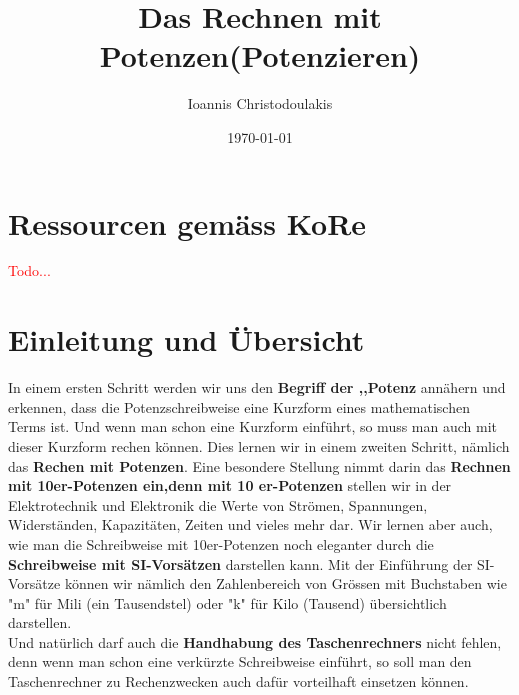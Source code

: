 \documentclass[11pt, a4paper, twoside, fleqn]{article}
\title{Das Rechnen mit Potenzen(Potenzieren)}
\author{Ioannis Christodoulakis}
\date{\today}
\begin{document}
\maketitle
\newpage
\tableofcontents
\newpage
\section{Ressourcen gemäss KoRe}
\textcolor{red}{Todo...}
\section{Einleitung und Übersicht}
In einem ersten Schritt werden wir uns den \textbf{ Begriff der  ,,Potenz} annähern und erkennen, dass die Potenzschreibweise eine Kurzform eines mathematischen Terms ist. Und wenn man schon eine Kurzform einführt, so muss man auch mit dieser Kurzform rechen können. Dies lernen wir in einem zweiten Schritt, nämlich das \textbf{Rechen mit Potenzen}. Eine besondere Stellung nimmt darin das \textbf{Rechnen mit 10er-Potenzen ein,denn mit 10 er-Potenzen} stellen wir in der Elektrotechnik und Elektronik die Werte von Strömen, Spannungen, Widerständen, Kapazitäten, Zeiten und vieles mehr dar. Wir lernen aber auch, wie man die Schreibweise mit 10er-Potenzen noch eleganter durch die \textbf{Schreibweise mit SI-Vorsätzen}  darstellen kann. Mit der Einführung der SI-Vorsätze können wir nämlich den Zahlenbereich von Grössen mit Buchstaben wie "m" für Mili (ein Tausendstel) oder "k" für Kilo (Tausend) übersichtlich darstellen. \\
Und natürlich darf auch die \textbf{Handhabung des Taschenrechners} nicht fehlen, denn wenn man schon eine verkürzte Schreibweise einführt, so soll man den Taschenrechner zu Rechenzwecken auch dafür vorteilhaft einsetzen können.
\newpage
\end{document}
